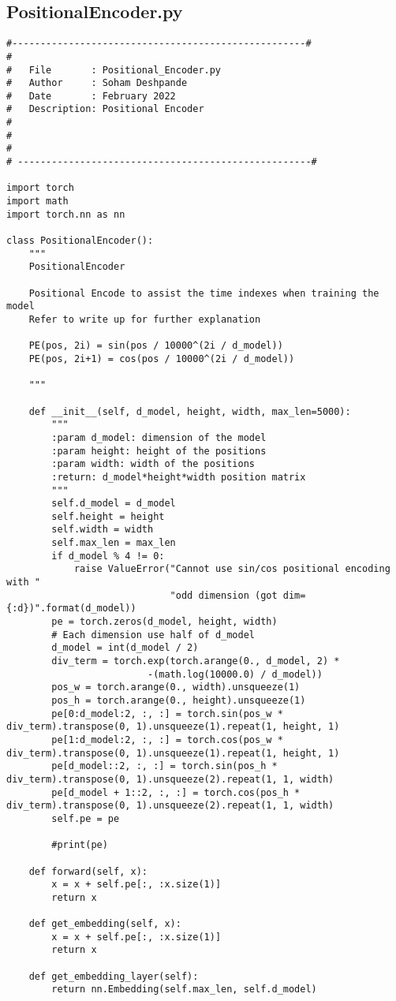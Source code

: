 \documentclass{article}
\begin{document}
\subsection{PositionalEncoder.py}
\begin{lstlisting}
#----------------------------------------------------#
#
#   File       : Positional_Encoder.py
#   Author     : Soham Deshpande
#   Date       : February 2022
#   Description: Positional Encoder
#
#
#
# ----------------------------------------------------#

import torch
import math
import torch.nn as nn

class PositionalEncoder():
    """
    PositionalEncoder

    Positional Encode to assist the time indexes when training the model
    Refer to write up for further explanation

    PE(pos, 2i) = sin(pos / 10000^(2i / d_model))
    PE(pos, 2i+1) = cos(pos / 10000^(2i / d_model))

    """

    def __init__(self, d_model, height, width, max_len=5000):
        """
        :param d_model: dimension of the model
        :param height: height of the positions
        :param width: width of the positions
        :return: d_model*height*width position matrix
        """
        self.d_model = d_model
        self.height = height
        self.width = width
        self.max_len = max_len
        if d_model % 4 != 0:
            raise ValueError("Cannot use sin/cos positional encoding with "
                             "odd dimension (got dim={:d})".format(d_model))
        pe = torch.zeros(d_model, height, width)
        # Each dimension use half of d_model
        d_model = int(d_model / 2)
        div_term = torch.exp(torch.arange(0., d_model, 2) *
                         -(math.log(10000.0) / d_model))
        pos_w = torch.arange(0., width).unsqueeze(1)
        pos_h = torch.arange(0., height).unsqueeze(1)
        pe[0:d_model:2, :, :] = torch.sin(pos_w * div_term).transpose(0, 1).unsqueeze(1).repeat(1, height, 1)
        pe[1:d_model:2, :, :] = torch.cos(pos_w * div_term).transpose(0, 1).unsqueeze(1).repeat(1, height, 1)
        pe[d_model::2, :, :] = torch.sin(pos_h * div_term).transpose(0, 1).unsqueeze(2).repeat(1, 1, width)
        pe[d_model + 1::2, :, :] = torch.cos(pos_h * div_term).transpose(0, 1).unsqueeze(2).repeat(1, 1, width)
        self.pe = pe

        #print(pe)

    def forward(self, x):
        x = x + self.pe[:, :x.size(1)]
        return x

    def get_embedding(self, x):
        x = x + self.pe[:, :x.size(1)]
        return x

    def get_embedding_layer(self):
        return nn.Embedding(self.max_len, self.d_model)









\end{lstlisting}
\end{document}
